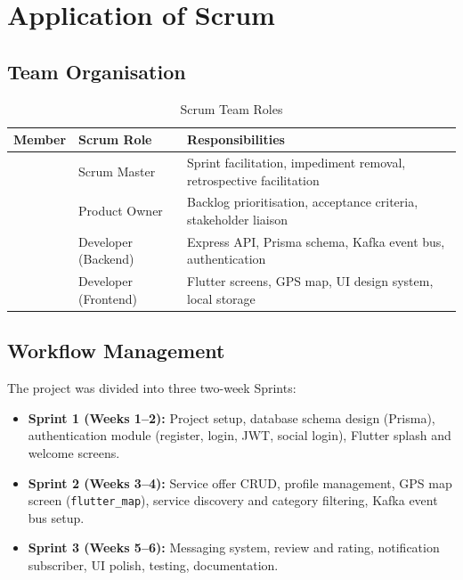 \documentclass[12pt,a4paper]{report}
\begin{document}
\section{Application of Scrum}

\subsection{Team Organisation}

\begin{table}[H]
\centering
\renewcommand{\arraystretch}{1.3}
\begin{tabularx}{\linewidth}{l l X}
\toprule
\textbf{Member} & \textbf{Scrum Role} & \textbf{Responsibilities} \\
\midrule
[Name 1] & Scrum Master        & Sprint facilitation, impediment removal, retrospective facilitation \\
[Name 2] & Product Owner       & Backlog prioritisation, acceptance criteria, stakeholder liaison \\
[Name 3] & Developer (Backend) & Express API, Prisma schema, Kafka event bus, authentication \\
[Name 4] & Developer (Frontend)& Flutter screens, GPS map, UI design system, local storage \\
\bottomrule
\end{tabularx}
\caption{Scrum Team Roles}
\end{table}

\subsection{Workflow Management}

The project was divided into three two-week Sprints:

\begin{itemize}
  \item \textbf{Sprint 1 (Weeks 1--2):} Project setup, database schema design (Prisma), authentication module (register, login, JWT, social login), Flutter splash and welcome screens.
  \item \textbf{Sprint 2 (Weeks 3--4):} Service offer CRUD, profile management, GPS map screen (\texttt{flutter\_map}), service discovery and category filtering, Kafka event bus setup.
  \item \textbf{Sprint 3 (Weeks 5--6):} Messaging system, review and rating, notification subscriber, UI polish, testing, documentation.
\end{itemize}
\end{document}
